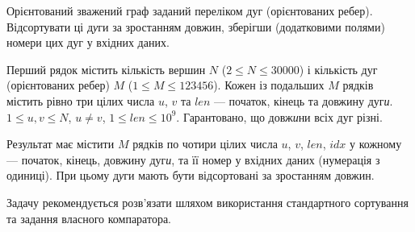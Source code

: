 ﻿Орієнтований зважений граф заданий переліком дуг (орієнтованих ребер). Відсортувати ці д\emph{у}ги за зростанням довжин, зберігши (додатковими полями) номери цих дуг у вхідних даних.

\InputFile

Перший рядок містить кількість вершин $N$ ($2\leqslant N\leqslant 30000$) і кількість дуг (орієнтованих ребер) $M$ ($1\leqslant M\leqslant 123456$). Кожен із подальших $M$ рядків містить рівно три цілих числа $u$, $v$ та $len$ --- початок, кінець та довжину дуг\emph{и}. $1\leqslant u, v\leqslant N$, $u\neq v$, $1\leqslant len\leqslant 10^9$. Гарантовано, що довж\emph{и}ни всіх дуг різні.

\OutputFile

Результат має містити $M$ рядків по чотири цілих числа $u$, $v$, $len$, $idx$ у кожному --- початок, кінець, довжину дуг\emph{и}, та її номер у вхідних даних (нумерація з одиниці). При цьому д\emph{у}ги мають бути відсортовані за зростанням довжин.

\Note

Задачу рекомендується розв'язати шляхом використання стандартного сортування та задання власного компаратора. 